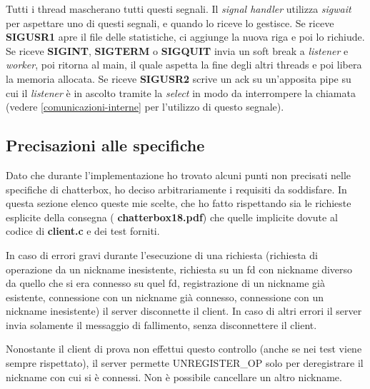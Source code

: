 \documentclass[a4paper]{article}
\theoremstyle{theorem}
\theoremstyle{remark}
\theoremstyle{definition}
\theoremstyle{corollary}
\theoremstyle{lemma}
\newcommand\file[1]{%
	\textbf{#1}}
\newcommand\codeName[1]{%
	\textit{#1}}
\begin{document}
Tutti i thread mascherano tutti questi segnali. Il \codeName{signal handler} utilizza \codeName{sigwait} per aspettare uno di questi segnali, e quando lo riceve lo gestisce. Se riceve \textbf{SIGUSR1} apre il file delle statistiche, ci aggiunge la nuova riga e poi lo richiude. Se riceve \textbf{SIGINT}, \textbf{SIGTERM} o \textbf{SIGQUIT} invia un soft break a \codeName{listener} e \codeName{worker}, poi ritorna al main, il quale aspetta la fine degli altri threads e poi libera la memoria allocata. Se riceve \textbf{SIGUSR2} scrive un ack su un'apposita pipe su cui il \codeName{listener} è in ascolto tramite la \codeName{select} in modo da interrompere la chiamata (vedere \autoref{comunicazioni-interne} per l'utilizzo di questo segnale).

\subsection{Precisazioni alle specifiche}
Dato che durante l'implementazione ho trovato alcuni punti non precisati nelle specifiche di chatterbox, ho deciso arbitrariamente i requisiti da soddisfare. In questa sezione elenco queste mie scelte, che ho fatto rispettando sia le richieste esplicite della consegna (\file{chatterbox18.pdf}) che quelle implicite dovute al codice di \file{client.c} e dei test forniti.

In caso di errori gravi durante l'esecuzione di una richiesta (richiesta di operazione da un nickname inesistente, richiesta su un fd con nickname diverso da quello che si era connesso su quel fd, registrazione di un nickname già esistente, connessione con un nickname già connesso, connessione con un nickname inesistente) il server disconnette il client. In caso di altri errori il server invia solamente il messaggio di fallimento, senza disconnettere il client.

Nonostante il client di prova non effettui questo controllo (anche se nei test viene sempre rispettato), il server permette UNREGISTER\_OP solo per deregistrare il nickname con cui si è connessi. Non è possibile cancellare un altro nickname.
\end{document}
